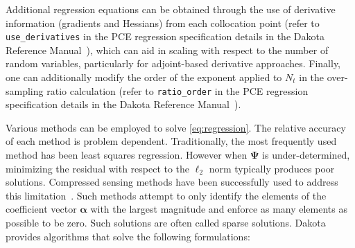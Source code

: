 Additional regression equations can be obtained through the use of
derivative information (gradients and Hessians) from each collocation
point (refer to {\tt use\_derivatives} in the PCE regression
specification details in the Dakota Reference Manual~\cite{RefMan}),
which can aid in scaling with respect to the number of random
variables, particularly for adjoint-based derivative approaches.
Finally, one can additionally modify the order of the exponent 
applied to $N_t$ in the over-sampling ratio calculation (refer to 
{\tt ratio\_order} in the PCE regression specification details in the
Dakota Reference Manual~\cite{RefMan}).

Various methods can be employed to solve \eqref{eq:regression}.  The
relative accuracy of each method is problem dependent. Traditionally,
the most frequently used method has been least squares
regression. However when $\boldsymbol{\Psi}$ is under-determined,
minimizing the residual with respect to the $\ell_2$ norm typically
produces poor solutions. Compressed sensing methods have been
successfully used to address this
limitation~\cite{Blatman2011,Doostan2011}.  Such methods attempt to
only identify the elements of the coefficient vector
$\boldsymbol{\alpha}$ with the largest magnitude and enforce as many
elements as possible to be zero. Such solutions are often called
sparse solutions. Dakota provides algorithms that solve the following
formulations:
